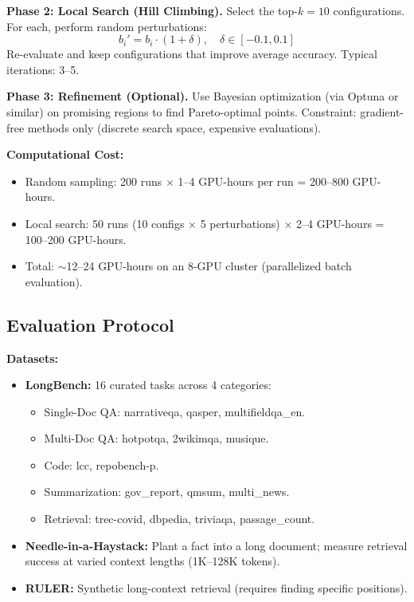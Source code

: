 \documentclass[11pt,a4paper]{article}
\begin{document}
\textbf{Phase 2: Local Search (Hill Climbing).}
Select the top-$k=10$ configurations. For each, perform random perturbations:
\[
b_i' = b_i \cdot (1 + \delta), \quad \delta \in [-0.1, 0.1]
\]
Re-evaluate and keep configurations that improve average accuracy. Typical iterations: 3–5.

\textbf{Phase 3: Refinement (Optional).}
Use Bayesian optimization (via Optuna or similar) on promising regions to find Pareto-optimal points. Constraint: gradient-free methods only (discrete search space, expensive evaluations).

\textbf{Computational Cost:}
\begin{itemize}
    \item Random sampling: 200 runs $\times$ 1–4 GPU-hours per run = 200–800 GPU-hours.
    \item Local search: 50 runs (10 configs $\times$ 5 perturbations) $\times$ 2–4 GPU-hours = 100–200 GPU-hours.
    \item Total: $\sim$12–24 GPU-hours on an 8-GPU cluster (parallelized batch evaluation).
\end{itemize}

\subsection{Evaluation Protocol}

\textbf{Datasets:}
\begin{itemize}
    \item \textbf{LongBench:} 16 curated tasks across 4 categories:
    \begin{itemize}
        \item Single-Doc QA: narrativeqa, qasper, multifieldqa\_en.
        \item Multi-Doc QA: hotpotqa, 2wikimqa, musique.
        \item Code: lcc, repobench-p.
        \item Summarization: gov\_report, qmsum, multi\_news.
        \item Retrieval: trec-covid, dbpedia, triviaqa, passage\_count.
    \end{itemize}
    \item \textbf{Needle-in-a-Haystack:} Plant a fact into a long document; measure retrieval success at varied context lengths (1K–128K tokens).
    \item \textbf{RULER:} Synthetic long-context retrieval (requires finding specific positions).
\end{itemize}
\end{document}
